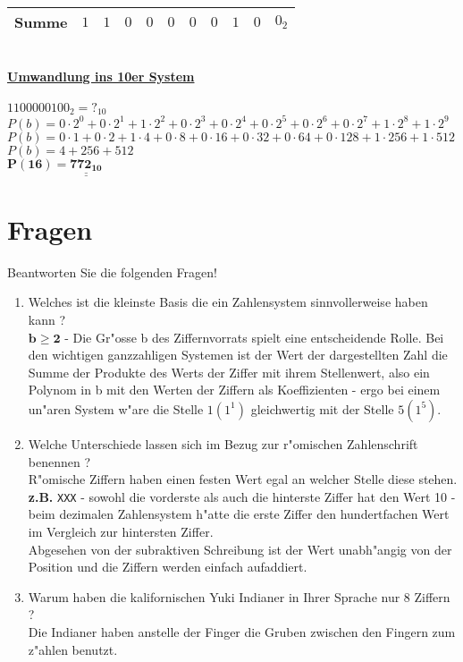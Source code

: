 \documentclass[a4paper,10pt]{article}
\def\doubleunderline#1{\underline{\underline{#1}}}
\begin{document}
\begin{enumerate}
{\begin{tabular}{c@{\,}c@{\,}c@{\,}c@{\,}c@{\,}c@{\,}c@{\,}c@{\,}c@{\,}c@{\,}c}
		\hline
		Summe & $1$ & $1$ & $0$ & $0$ & $0$ & $0$ & $0$ & $1$ & $0$ & $0_{2}$ \\
		\hline
		\hline		
		\end{tabular}
		\vspace{4mm}		
		\\
		 \textbf{\underline{Umwandlung ins 10er System}} \\
		 \\
	 	 $1100000100_{2} = ?_{10}$ \\
		 $P(b)= 0 \cdot 2^0 + 0 \cdot 2^1 + 1 \cdot 2^2 + 0 \cdot 2^3 + 0 \cdot 2^4 + 0 \cdot 2^5 + 0 \cdot 2^6 + 0 \cdot 2^7 + 1 \cdot 2^8 + 1 \cdot 2^9$ \\
		 $P(b)= 0 \cdot 1 + 0 \cdot 2 + 1 \cdot 4 + 0 \cdot 8 + 0 \cdot 16 + 0 \cdot 32 + 0 \cdot 64 + 0 \cdot 128 + 1 \cdot 256 + 1 \cdot 512$ \\
		 $P(b)= 4 + 256 + 512 $ \\
		 $\mathbf{P(16)= \doubleunderline{772_{10}}}$ \\			 
	 }

\end{enumerate}


\section{Fragen}

Beantworten Sie die folgenden Fragen!

\begin{enumerate}
\item Welches ist die kleinste Basis die ein Zahlensystem sinnvollerweise haben kann ? \\
	 {\color{ForestGreen}
	 	$\mathbf{b \geq 2}$ - Die Gr"osse b des Ziffernvorrats spielt eine entscheidende Rolle. Bei den wichtigen ganzzahligen Systemen ist der Wert der dargestellten Zahl die Summe der Produkte des Werts der Ziffer mit ihrem Stellenwert, 
	 	also ein Polynom in b mit den Werten der Ziffern als Koeffizienten - ergo bei einem un"aren System w"are die Stelle $1 (1^1)$ gleichwertig mit der Stelle $5 (1^5)$.
	}
\item Welche Unterschiede lassen sich im Bezug zur r"omischen Zahlenschrift benennen ? \\
	 {\color{ForestGreen}
		R"omische Ziffern haben einen festen Wert egal an welcher Stelle diese stehen.
		\\
		\textbf{z.B.} \verb|XXX| - sowohl die vorderste als auch die hinterste Ziffer hat den Wert 10 - beim dezimalen Zahlensystem h"atte die erste Ziffer den hundertfachen Wert im Vergleich zur hintersten Ziffer.
		\\
		Abgesehen von der subraktiven Schreibung ist der Wert unabh"angig von der Position und die Ziffern werden einfach aufaddiert.
	}
\item Warum haben die kalifornischen Yuki Indianer in Ihrer Sprache nur 8 Ziffern ? \\
	 {\color{ForestGreen}
		Die Indianer haben anstelle der Finger die Gruben zwischen den Fingern zum z"ahlen benutzt.
	}
\end{enumerate}
\end{document}
